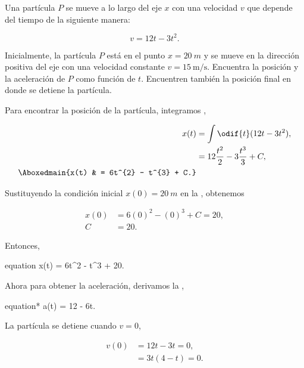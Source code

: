 \documentclass[../main.tex]{subfiles}
\begin{document}
\begin{problema}
	Una partícula \(P\) se mueve a lo largo del eje \(x\)
	con una velocidad \(v\) que depende del tiempo
	de la siguiente manera:

	\begin{equation}
		v = 12t - 3t^{2}.
		\label{eq:velP}
	\end{equation}

	Inicialmente, la partícula \(P\) está en el punto
	\(x = \qty{20}{m}\) y se mueve en la dirección positiva
	del eje con una velocidad constante \(v = \qty{15}{\m\per\s}\).
	Encuentra la posición y la aceleración de \(P\) como función
	de \(t\). Encuentren también la posición final en donde se
	detiene la partícula.

	\startsolution

	Para encontrar la posición de la partícula, integramos ,

	\begin{align}
		x(t)             & = \int \odif{t} (12t - 3t^{2}),\nonumber                \\
		                 & = 12\dfrac{t^{2}}{2} - 3 \dfrac{t^{3}}{3} + C,\nonumber \\
		\Aboxedmain{x(t) & = 6t^{2} - t^{3} + C.} \label{eq:XtWCte}
	\end{align}

	Sustituyendo la condición inicial \(x(0) = \qty{20}{m}\) en la , obtenemos

	\begin{align*}
		x(0) & = 6(0)^{2} - (0)^{3} + C = 20,\nonumber \\
		C    & = 20.
	\end{align*}

	Entonces,

	\begin{empheq}[box=\mainresult]{equation}
		x(t) = 6t^{2} - t^{3} + 20.
		\label{eq:xT}
	\end{empheq}

	Ahora para obtener la aceleración, derivamos la ,

	\begin{empheq}[box=\mainresult]{equation*}
		a(t) = 12 - 6t.
	\end{empheq}

	La partícula se detiene cuando \(v = 0\),

	\begin{align*}
		v(0) & = 12t - 3t = 0,  \\
		     & = 3t(4 - t) = 0.
	\end{align*}


\end{problema}
\end{document}
